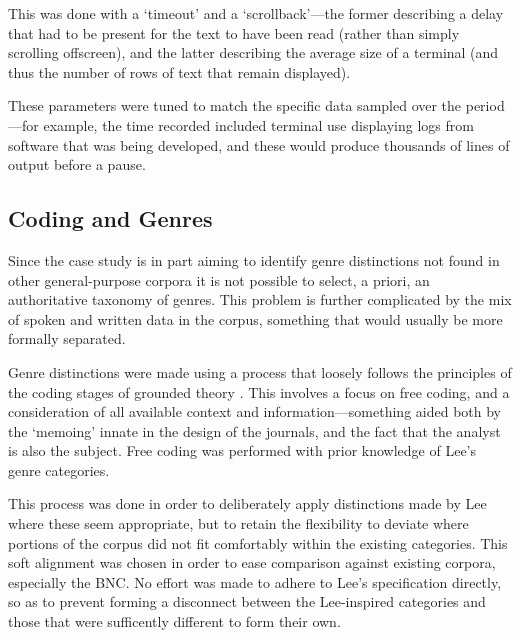 This was done with a `timeout' and a `scrollback'---the former describing a delay that had to be present for the text to have been read (rather than simply scrolling offscreen), and the latter describing the average size of a terminal (and thus the number of rows of text that remain displayed).

These parameters were tuned to match the specific data sampled over the period---for example, the time recorded included terminal use displaying logs from software that was being developed, and these would produce thousands of lines of output before a pause.




\subsection{Coding and Genres}
Since the case study is in part aiming to identify genre distinctions not found in other general-purpose corpora it is not possible to select, a priori, an authoritative taxonomy of genres.  This problem is further complicated by the mix of spoken and written data in the corpus, something that would usually be more formally separated.


Genre distinctions were made using a process that loosely follows the principles of the coding stages of grounded theory .  
This involves a focus on free coding, and a consideration of all available context and information---something aided both by the `memoing' innate in the design of the journals, and the fact that the analyst is also the subject.  Free coding was performed with prior knowledge of Lee's genre categories.


This process was done in order to deliberately apply distinctions made by Lee where these seem appropriate, but to retain the flexibility to deviate where portions of the corpus did not fit comfortably within the existing categories.  This soft alignment was chosen in order to ease comparison against existing corpora, especially the BNC.  No effort was made to adhere to Lee's specification directly, so as to prevent forming a disconnect between the Lee-inspired categories and those that were sufficently different to form their own.

